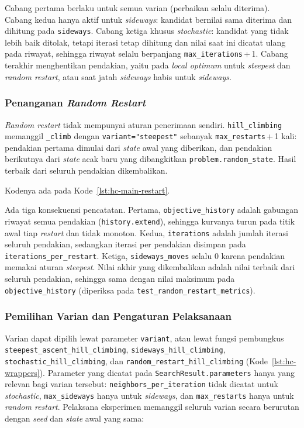 Cabang pertama berlaku untuk semua varian (perbaikan selalu diterima). Cabang kedua hanya aktif untuk \textit{sideways}: kandidat bernilai sama diterima dan dihitung pada \texttt{sideways}. Cabang ketiga khusus \textit{stochastic}: kandidat yang tidak lebih baik ditolak, tetapi iterasi tetap dihitung dan nilai saat ini dicatat ulang pada riwayat, sehingga riwayat selalu berpanjang \texttt{max\_iterations}\,+\,1. Cabang terakhir menghentikan pendakian, yaitu pada \textit{local optimum} untuk \textit{steepest} dan \textit{random restart}, atau saat jatah \textit{sideways} habis untuk \textit{sideways}.

\subsubsection{Penanganan \textit{Random Restart}}

\textit{Random restart} tidak mempunyai aturan penerimaan sendiri. \texttt{hill\_climbing} memanggil \texttt{\_climb} dengan \texttt{variant="steepest"} sebanyak \texttt{max\_restarts}\,+\,1 kali: pendakian pertama dimulai dari \textit{state} awal yang diberikan, dan pendakian berikutnya dari \textit{state} acak baru yang dibangkitkan \texttt{problem.random\_state}. Hasil terbaik dari seluruh pendakian dikembalikan.

Kodenya ada pada Kode~\ref{lst:hc-main-restart}.

Ada tiga konsekuensi pencatatan. Pertama, \texttt{objective\_history} adalah gabungan riwayat semua pendakian (\texttt{history.extend}), sehingga kurvanya turun pada titik awal tiap \textit{restart} dan tidak monoton. Kedua, \texttt{iterations} adalah jumlah iterasi seluruh pendakian, sedangkan iterasi per pendakian disimpan pada \texttt{iterations\_per\_restart}. Ketiga, \texttt{sideways\_moves} selalu 0 karena pendakian memakai aturan \textit{steepest}. Nilai akhir yang dikembalikan adalah nilai terbaik dari seluruh pendakian, sehingga sama dengan nilai maksimum pada \texttt{objective\_history} (diperiksa pada \texttt{test\_random\_restart\_metrics}).

\subsubsection{Pemilihan Varian dan Pengaturan Pelaksanaan}

Varian dapat dipilih lewat parameter \texttt{variant}, atau lewat fungsi pembungkus \texttt{steepest\_ascent\_hill\_climbing}, \texttt{sideways\_hill\_climbing}, \texttt{stochastic\_hill\_climbing}, dan \texttt{random\_restart\_hill\_climbing} (Kode~\ref{lst:hc-wrappers}). Parameter yang dicatat pada \texttt{SearchResult.parameters} hanya yang relevan bagi varian tersebut: \texttt{neighbors\_per\_iteration} tidak dicatat untuk \textit{stochastic}, \texttt{max\_sideways} hanya untuk \textit{sideways}, dan \texttt{max\_restarts} hanya untuk \textit{random restart}. Pelaksana eksperimen memanggil seluruh varian secara berurutan dengan \textit{seed} dan \textit{state} awal yang sama:

